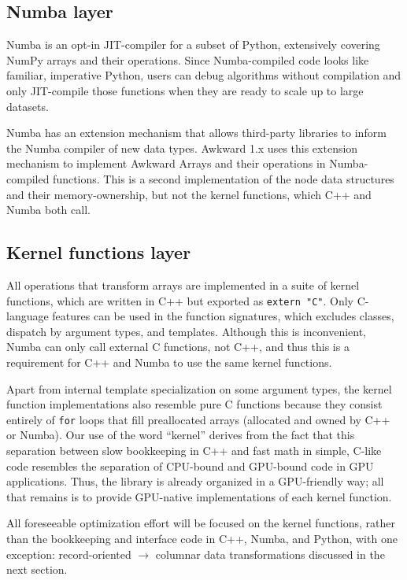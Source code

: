 \documentclass{webofc}
\begin{document}
\subsection{Numba layer}

Numba is an opt-in JIT-compiler for a subset of Python, extensively covering NumPy arrays and their operations. Since Numba-compiled code looks like familiar, imperative Python, users can debug algorithms without compilation and only JIT-compile those functions when they are ready to scale up to large datasets.

Numba has an extension mechanism that allows third-party libraries to inform the Numba compiler of new data types. Awkward 1.x uses this extension mechanism to implement Awkward Arrays and their operations in Numba-compiled functions. This is a second implementation of the node data structures and their memory-ownership, but not the kernel functions, which C++ and Numba both call.

\subsection{Kernel functions layer}

All operations that transform arrays are implemented in a suite of kernel functions, which are written in C++ but exported as \texttt{extern "C"}. Only C-language features can be used in the function signatures, which excludes classes, dispatch by argument types, and templates. Although this is inconvenient, Numba can only call external C functions, not C++, and thus this is a requirement for C++ and Numba to use the same kernel functions.

Apart from internal template specialization on some argument types, the kernel function implementations also resemble pure C functions because they consist entirely of \texttt{for} loops that fill preallocated arrays (allocated and owned by C++ or Numba). Our use of the word ``kernel'' derives from the fact that this separation between slow bookkeeping in C++ and fast math in simple, C-like code resembles the separation of CPU-bound and GPU-bound code in GPU applications. Thus, the library is already organized in a GPU-friendly way; all that remains is to provide GPU-native implementations of each kernel function.

All foreseeable optimization effort will be focused on the kernel functions, rather than the bookkeeping and interface code in C++, Numba, and Python, with one exception: record-oriented $\to$ columnar data transformations discussed in the next section.
\end{document}
